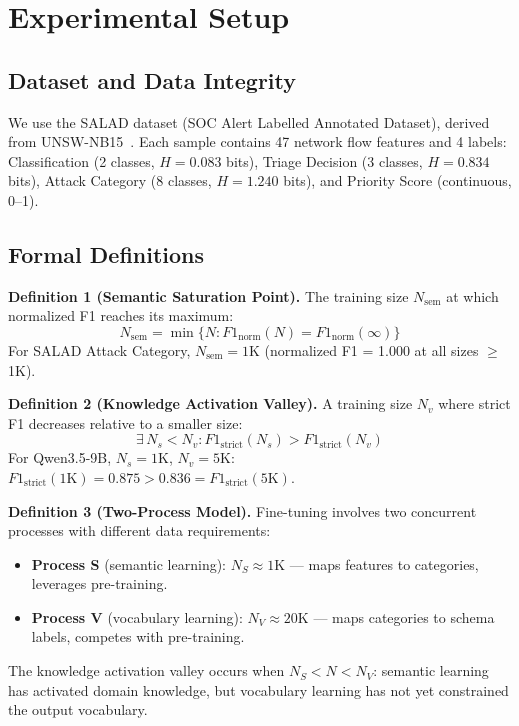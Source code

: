\documentclass[review,3p]{elsarticle}
\begin{document}
\section{Experimental Setup}

\subsection{Dataset and Data Integrity}
We use the SALAD dataset (SOC Alert Labelled Annotated Dataset), derived from UNSW-NB15~\cite{moustafa2016}. Each sample contains 47 network flow features and 4 labels: Classification (2 classes, $H=0.083$ bits), Triage Decision (3 classes, $H=0.834$ bits), Attack Category (8 classes, $H=1.240$ bits), and Priority Score (continuous, 0--1).

\subsection{Formal Definitions}

\noindent\textbf{Definition 1 (Semantic Saturation Point).} The training size $N_\text{sem}$ at which normalized F1 reaches its maximum:
\begin{equation}
N_\text{sem} = \min\{N : F1_\text{norm}(N) = F1_\text{norm}(\infty)\}
\end{equation}
For SALAD Attack Category, $N_\text{sem} = 1\text{K}$ (normalized F1 = 1.000 at all sizes $\geq$ 1K).

\noindent\textbf{Definition 2 (Knowledge Activation Valley).} A training size $N_v$ where strict F1 decreases relative to a smaller size:
\begin{equation}
\exists\, N_s < N_v : F1_\text{strict}(N_s) > F1_\text{strict}(N_v)
\end{equation}
For Qwen3.5-9B, $N_s = 1\text{K}$, $N_v = 5\text{K}$: $F1_\text{strict}(1\text{K}) = 0.875 > 0.836 = F1_\text{strict}(5\text{K})$.

\noindent\textbf{Definition 3 (Two-Process Model).} Fine-tuning involves two concurrent processes with different data requirements:
\begin{itemize}
\item \textbf{Process S} (semantic learning): $N_S \approx 1\text{K}$ --- maps features to categories, leverages pre-training.
\item \textbf{Process V} (vocabulary learning): $N_V \approx 20\text{K}$ --- maps categories to schema labels, competes with pre-training.
\end{itemize}
The knowledge activation valley occurs when $N_S < N < N_V$: semantic learning has activated domain knowledge, but vocabulary learning has not yet constrained the output vocabulary.
\end{document}

